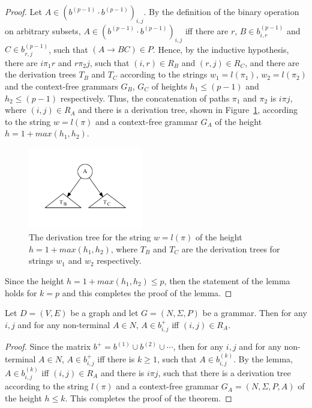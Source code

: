 \begin{proof}
Let $A \in (b^{(p-1)} \cdot b^{(p-1)})_{i,j}$. By the definition of the binary operation on arbitrary subsets, $A \in (b^{(p-1)} \cdot b^{(p-1)})_{i,j}$ iff there are $r$, $B \in b^{(p-1)}_{i,r}$ and $C \in b^{(p-1)}_{r,j}$, such that $(A \rightarrow B C) \in P$. Hence, by the inductive hypothesis, there are $i \pi_1 r$ and $r \pi_2 j$, such that $(i,r) \in R_B$ and $(r,j) \in R_C$, and there are the derivation trees $T_B$ and $T_C$ according to the strings $w_1 = l(\pi_1)$, $w_2 = l(\pi_2)$ and the context-free grammars $G_B$, $G_C$ of heights $h_1 \leq (p-1)$ and $h_2 \leq (p-1)$ respectively. Thus, the concatenation of paths $\pi_1$ and $\pi_2$ is $i \pi j$, where $(i,j) \in R_A$ and there is a derivation tree, shown in Figure~\ref{tree2}, according to the string $w = l(\pi)$ and a context-free grammar $G_A$ of the height $h = 1 + max(h_1, h_2)$.

\begin{figure}[h!]
 \centering
 \includegraphics[width=5cm]{pictures/tree2.pdf}
 \caption{The derivation tree for the string $w = l(\pi)$ of the height $h = 1 + max(h_1, h_2)$, where $T_B$ and $T_C$ are the derivation trees for strings $w_1$ and $w_2$ respectively.}
 \label{tree2}
\end{figure}

Since the height $h = 1 + max(h_1, h_2) \leq p$, then the statement of the lemma holds for $k = p$ and this completes the proof of the lemma.
\end{proof}

\begin{mytheorem}\label{thm:correct}
 Let $D = (V,E)$ be a graph and let $G =(N,\Sigma,P)$ be a grammar. Then for any $i, j$ and for any non-terminal $A \in N$, $A \in b^+_{i,j}$ iff $(i,j) \in R_A$.
\end{mytheorem}
\begin{proof}

Since the matrix $b^+ = b^{(1)} \cup b^{(2)} \cup \cdots$, then for any $i, j$ and for any non-terminal $A \in N$, $A \in b^+_{i,j}$ iff there is $k \geq 1$, such that $A \in b^{(k)}_{i,j}$. By the lemma, $A \in b^{(k)}_{i,j}$ iff $(i,j) \in R_A$ and there is $i \pi j$, such that there is a derivation tree according to the string $l(\pi)$ and a context-free grammar $G_A = (N,\Sigma,P,A)$ of the height $h \leq k$. This completes the proof of the theorem.
\end{proof}

